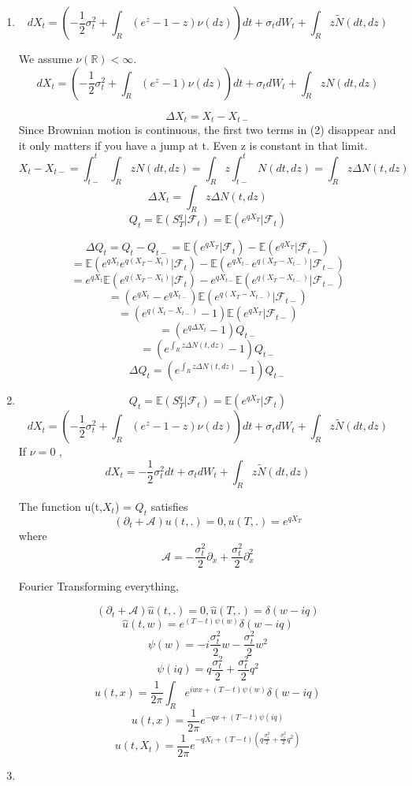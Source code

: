 \documentclass[a4paper,11pt]{article}
\begin{document}
\begin{enumerate}
\begin{enumerate}
\item
\[dX_t  = ( - \frac{1}{2}\sigma_t^2 + \int_R (e^{z}-1-z)\nu(dz)) dt+ \sigma_t dW_t +\int_R z \widetilde{N}(dt,dz)\]

We assume $\nu(\mathbb{R}) < \infty$.
\begin{equation}
dX_t  = ( - \frac{1}{2}\sigma_t^2 + \int_R (e^{z}-1)\nu(dz)) dt+ \sigma_t dW_t +\int_R z N(dt,dz)
\end{equation}

\[\Delta X_t = X_t - X_{t-}\] 
Since Brownian motion is continuous, the first two terms in (2) disappear and it only matters if you have a jump at t. Even z is constant in that limit.
\[ X_t - X_{t-} = \int_{t-}^t\int_R z N(dt,dz) = \int_R z \int_{t-}^t N(dt,dz) =  \int_R z \Delta N(t,dz)\]
\[\Delta X_t = \int_R z \Delta N(t,dz) \]
\[Q_t = \mathbb{E}(S_T^q|\mathcal{F}_t) = \mathbb{E}(e^{qX_T}|\mathcal{F}_t)\]

\[\Delta Q_t = Q_t - Q_{t-} = \mathbb{E}(e^{qX_T}|\mathcal{F}_t)- \mathbb{E}(e^{qX_T}|\mathcal{F}_{t-}) \]
\[= \mathbb{E}(e^{qX_{t}}e^{q(X_T-X_t)}|\mathcal{F}_t)- \mathbb{E}(e^{qX_{t-}}e^{q(X_T-X_{t-})}|\mathcal{F}_{t-}) \]
\[= e^{qX_{t}} \mathbb{E}(e^{q(X_T-X_t)}|\mathcal{F}_t)- e^{qX_{t-}}\mathbb{E}(e^{q(X_T-X_{t-})}|\mathcal{F}_{t-}) \]
\[= (e^{qX_{t}} - e^{qX_{t-}}) \mathbb{E}(e^{q(X_T-X_{t-})}|\mathcal{F}_{t-})  \]
\[= (e^{q(X_t-X_{t-})}-1) \mathbb{E}(e^{qX_T}|\mathcal{F}_{t-})  \]
\[= (e^{q \Delta X_t}-1) Q_{t-}  \]
\[= (e^{\int_R z \Delta N(t,dz)}-1) Q_{t-}  \]
\[\boxed{\Delta Q_t = (e^{\int_R z \Delta N(t,dz)}-1) Q_{t-}}\]
\item
\[Q_t = \mathbb{E}(S_T^q|\mathcal{F}_t) = \mathbb{E}(e^{qX_T}|\mathcal{F}_t)\] 
\[dX_t  = ( - \frac{1}{2}\sigma_t^2 + \int_R (e^{z}-1-z)\nu(dz)) dt+ \sigma_t dW_t +\int_R z \widetilde{N}(dt,dz)\]
 If $\nu = 0$ ,
 \[dX_t  =  - \frac{1}{2}\sigma_t^2 dt+ \sigma_t dW_t +\int_R z \widetilde{N}(dt,dz)\]

The function u(t,$X_t$) = $ Q_t$ satisfies
\[(\partial_t + \mathcal{A})u(t,.)= 0,  u(T,.)= e^{qX_T} \]
where 
\[\mathcal{A}  = -\frac{\sigma_t^2}{2}\partial_x  +\frac{\sigma_t^2}{2} \partial_x^2\]

Fourier Transforming everything,

\[(\partial_t + \mathcal{A}) \hat{u}(t,.)= 0,  \hat{u}(T,.)= \delta(w-iq) \]
\[\hat{u}(t,w) = e^{(T-t)\psi(w)}\delta(w-iq)\]
\[\psi(w)= -i\frac{\sigma_t^2}{2}w-\frac{\sigma_t^2}{2}w^2 \]
\[\psi(iq)= q\frac{\sigma_t^2}{2}+\frac{\sigma_t^2}{2}q^2 \]
\[u(t,x) = \frac{1}{2\pi} \int_R e^{iwx+(T-t)\psi(w) }\delta(w-iq)\]
\[u(t,x) = \frac{1}{2\pi}  e^{-qx+(T-t)\psi(iq) }\]
\[\boxed{u(t,X_t) = \frac{1}{2\pi}  e^{-qX_t+(T-t)(q\frac{\sigma_t^2}{2}+\frac{\sigma_t^2}{2}q^2) } }\]
\item


\end{enumerate}
\end{enumerate}
\end{document}
